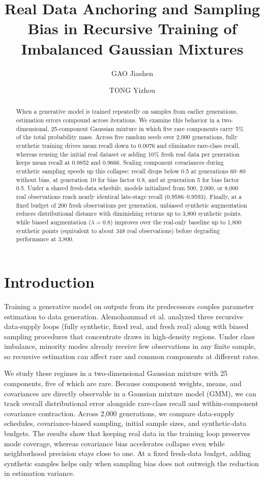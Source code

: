 \documentclass[11pt,a4paper]{article}
\title{Real Data Anchoring and Sampling Bias in Recursive Training of Imbalanced Gaussian Mixtures}
\author[1]{GAO Jiashen}
\author[1]{TONG Yizhou}
\affil[1]{The Hong Kong University of Science and Technology, Clear Water Bay, Kowloon, Hong Kong}
\date{}
\begin{document}
\maketitle


\begin{abstract}

When a generative model is trained repeatedly on samples from earlier generations, estimation errors compound across iterations. We examine this behavior in a two-dimensional, 25-component Gaussian mixture in which five rare components carry 5\% of the total probability mass. Across five random seeds over 2,000 generations, fully synthetic training drives mean recall down to 0.0076 and eliminates rare-class recall, whereas reusing the initial real dataset or adding 10\% fresh real data per generation keeps mean recall at 0.9852 and 0.9666. Scaling component covariances during synthetic sampling speeds up this collapse: recall drops below 0.5 at generations 60--80 without bias, at generation 10 for bias factor 0.8, and at generation 5 for bias factor 0.5. Under a shared fresh-data schedule, models initialized from 500, 2,000, or 8,000 real observations reach nearly identical late-stage recall (0.9586--0.9593). Finally, at a fixed budget of 200 fresh observations per generation, unbiased synthetic augmentation reduces distributional distance with diminishing returns up to 3,800 synthetic points, while biased augmentation ($\lambda=0.8$) improves over the real-only baseline up to 1,800 synthetic points (equivalent to about 348 real observations) before degrading performance at 3,800.


\end{abstract}

\FloatBarrier
\section{Introduction}

Training a generative model on outputs from its predecessors couples parameter estimation to data generation. Alemohammad et al. \cite{r1} analyzed three recursive data-supply loops (fully synthetic, fixed real, and fresh real) along with biased sampling procedures that concentrate draws in high-density regions. Under class imbalance, minority modes already receive few observations in any finite sample, so recursive estimation can affect rare and common components at different rates.


We study these regimes in a two-dimensional Gaussian mixture with 25 components, five of which are rare. Because component weights, means, and covariances are directly observable in a Gaussian mixture model (GMM), we can track overall distributional error alongside rare-class recall and within-component covariance contraction. Across 2,000 generations, we compare data-supply schedules, covariance-biased sampling, initial sample sizes, and synthetic-data budgets. The results show that keeping real data in the training loop preserves mode coverage, whereas covariance bias accelerates collapse even while neighborhood precision stays close to one. At a fixed fresh-data budget, adding synthetic samples helps only when sampling bias does not outweigh the reduction in estimation variance.
\end{document}
